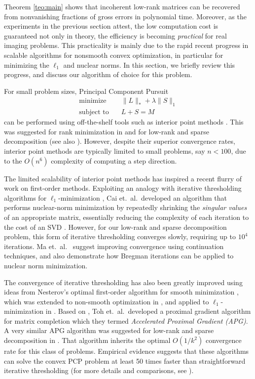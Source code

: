 Theorem \ref{teo:main} shows that incoherent low-rank matrices can be recovered from nonvanishing fractions of gross errors in polynomial time. Moreover, as the experiments in the previous section attest, the low computation cost is guaranteed not only in theory, the efficiency is becoming {\em practical} for real imaging problems. This practicality is mainly due to the rapid recent progress in scalable algorithms for nonsmooth convex optimization, in particular for minimizing the $\ell_1$ and nuclear norms. In this section, we briefly review this progress, and discuss our algorithm of choice for this problem.

For small problem sizes, Principal Component Pursuit
\[

\begin{array}{ll}
    \text{minimize}   & \quad \|L\|_* + \lambda \|S\|_1\\
    \text{subject to} & \quad L + S = M 
  \end{array}

\]
can be performed using off-the-shelf tools such as interior point methods \cite{Boyd-cvx}. This was suggested for rank minimization in \cite{FazelM2003-ACC,Recht2008-SR} and for low-rank and sparse decomposition \cite{Venkat-09} (see also \cite{Liu2009}). However, despite their superior convergence rates, interior point methods are typically limited to small problems, say $n < 100$, due to the $O(n^6)$ complexity of computing a step direction.  

The limited scalability of interior point methods has inspired a recent flurry of work on first-order methods. Exploiting an analogy with iterative thresholding algorithms for $\ell_1$-minimization
\cite{Yin2008,Yin2008-SJIS}, Cai et.\ al.\ developed an algorithm that performs nuclear-norm minimization by repeatedly shrinking the {\em
  singular values} of an appropriate matrix, essentially reducing the complexity of each iteration to the cost of an SVD \cite{Cai2008}. However, for our low-rank and sparse decomposition problem, this form of iterative thresholding converges slowly, requiring up to $10^4$ iterations. Ma et.\ al.\
\cite{Goldfarb2009,Ma2009} suggest improving convergence using continuation techniques, and also demonstrate how Bregman iterations \cite{Osher2005} can be applied to nuclear norm minimization.

The convergence of iterative thresholding has also been greatly improved using ideas from Nesterov's optimal first-order algorithm for smooth minimization \cite{Nesterov1983-SMD}, which was extended to non-smooth optimization in \cite{Nesterov2005,Beck2009}, and applied to $\ell_1$-minimization in \cite{Nesterov2007,Beck2009,Becker2009}. Based on \cite{Beck2009}, Toh
et.\ al.\ developed a proximal gradient algorithm for matrix completion which they termed {\em Accelerated Proximal Gradient (APG)}. A very similar APG algorithm was suggested for low-rank and sparse decomposition in \cite{Lin2009-APG}. That algorithm inherits the optimal $O(1/k^2)$ convergence rate for this class of problems. Empirical evidence suggests that these algorithms can solve the convex PCP problem at least 50 times faster than straightforward iterative thresholding (for more details and comparisons, see \cite{Lin2009-APG}).

